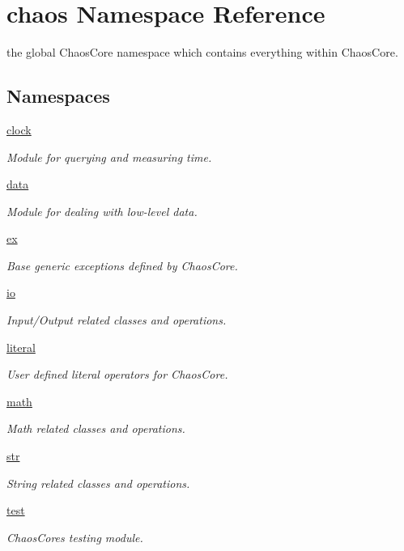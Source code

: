 \hypertarget{namespacechaos}{}\section{chaos Namespace Reference}
\label{namespacechaos}


the global Chaos\+Core namespace which contains everything within Chaos\+Core.  


\subsection*{Namespaces}
\begin{DoxyCompactItemize}
\item 
 \hyperlink{namespacechaos_1_1clock}{clock}
\begin{DoxyCompactList}\small\item\em Module for querying and measuring time. \end{DoxyCompactList}\item 
 \hyperlink{namespacechaos_1_1data}{data}
\begin{DoxyCompactList}\small\item\em Module for dealing with low-\/level data. \end{DoxyCompactList}\item 
 \hyperlink{namespacechaos_1_1ex}{ex}
\begin{DoxyCompactList}\small\item\em Base generic exceptions defined by Chaos\+Core. \end{DoxyCompactList}\item 
 \hyperlink{namespacechaos_1_1io}{io}
\begin{DoxyCompactList}\small\item\em Input/\+Output related classes and operations. \end{DoxyCompactList}\item 
 \hyperlink{namespacechaos_1_1literal}{literal}
\begin{DoxyCompactList}\small\item\em User defined literal operators for Chaos\+Core. \end{DoxyCompactList}\item 
 \hyperlink{namespacechaos_1_1math}{math}
\begin{DoxyCompactList}\small\item\em Math related classes and operations. \end{DoxyCompactList}\item 
 \hyperlink{namespacechaos_1_1str}{str}
\begin{DoxyCompactList}\small\item\em String related classes and operations. \end{DoxyCompactList}\item 
 \hyperlink{namespacechaos_1_1test}{test}
\begin{DoxyCompactList}\small\item\em Chaos\+Core\textquotesingle{}s testing module. \end{DoxyCompactList}\end{DoxyCompactItemize}
